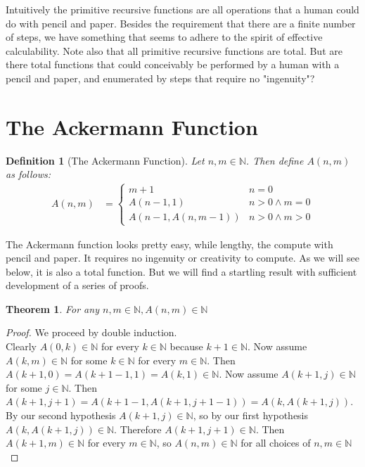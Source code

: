 \documentclass[12pt, letterpaper]{article}
\newtheorem{theorem}{Theorem}
\newtheorem*{definition}{Definition}
\theoremstyle{case}
\begin{document}
  Intuitively the primitive recursive functions are all operations that a human could do with pencil and paper.
  Besides the requirement that there are a finite number of steps, we have something that seems to adhere
  to the spirit of effective calculability. Note also that all primitive recursive functions are total.
  But are there total functions that could conceivably be performed by a human with a pencil and paper, and 
  enumerated by steps that require no "ingenuity"?

  \section{The Ackermann Function}
    \begin{definition}[The Ackermann Function]
      Let $n, m \in \mathbb{N}$. Then define $A(n, m)$ as follows:
      \begin{equation*}
        \begin{aligned}
          A(n, m) &=
          \begin{cases}
            m + 1                   & n = 0 \\
            A(n - 1, 1)             & n > 0 \wedge m = 0 \\
            A(n - 1, A(n, m - 1))   & n > 0 \wedge m > 0
          \end{cases}
        \end{aligned}
      \end{equation*}
    \end{definition}

    The Ackermann function looks pretty easy, while lengthy, the compute with pencil and paper. It requires no ingenuity
    or creativity to compute. As we will see below, it is also a total function. But we will find a startling result
    with sufficient development of a series of proofs.

    \begin{theorem}
      \label{inN}
      For any $n, m \in \mathbb{N}, A(n, m) \in \mathbb{N}$
    \end{theorem}
    \begin{proof}
      We proceed by double induction. \\
      Clearly $A(0, k) \in \mathbb{N}$ for every $k \in \mathbb{N}$ because $k + 1 \in \mathbb{N}$.
      Now assume $A(k, m) \in \mathbb{N}$ for some $k \in \mathbb{N}$ for every $m \in \mathbb{N}$.
      Then $A(k + 1, 0) = A(k + 1 - 1, 1) = A(k, 1) \in \mathbb{N}$.
      Now assume $A(k + 1, j) \in \mathbb{N}$ for some $j \in \mathbb{N}$.
      Then $A(k + 1, j + 1) = A(k + 1 - 1, A(k + 1, j + 1 - 1)) = A(k, A(k + 1, j))$.
      By our second hypothesis $A(k + 1, j) \in \mathbb{N}$, so by our first hypothesis $A(k, A(k + 1, j)) \in \mathbb{N}$.
      Therefore $A(k + 1, j + 1) \in \mathbb{N}$. Then $A(k + 1, m) \in \mathbb{N}$ for every $m \in \mathbb{N}$, so
      $A(n, m) \in \mathbb{N}$ for all choices of $n, m \in \mathbb{N}$
    \end{proof}
\end{document}

